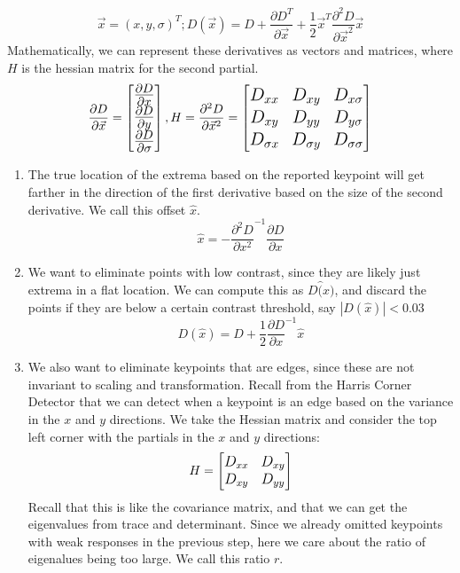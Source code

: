\documentclass{article}
\begin{document}
\begin{enumerate}
\begin{enumerate}
        $$\vec{x} = (x,y,\sigma)^T; D(\vec{x}) = D + \frac{\partial D^T}{\partial\vec{x}} + \frac{1}{2}\vec{x}^T\frac{\partial^2D}{\partial\vec{x}^2}\vec{x}$$
        Mathematically, we can represent these derivatives as vectors and matrices, where $H$ is the hessian matrix for the second partial.
        $$\frac{\partial D}{\partial \vec{x}} = \Large\begin{bmatrix}
        \frac{\partial D}{\partial x} \\
        \frac{\partial D}{\partial y} \\
        \frac{\partial D}{\partial \sigma}
        \end{bmatrix}, H = \frac{\partial^2D}{\partial\vec{x}^2} = \Large\begin{bmatrix}
        D_{xx} & D_{xy} & D_{x\sigma} \\
        D_{xy} & D_{yy} & D_{y\sigma} \\
        D_{\sigma x} & D_{\sigma y} & D_{\sigma\sigma}
        \end{bmatrix}$$ 
        \begin{enumerate}
            \item The true location of the extrema based on the reported keypoint will get farther in the direction of the first derivative based on the size of the second derivative. We call this offset $\hat{x}$.
            $$\hat{x} = - \frac{\partial^2D}{\partial x^2}^{-1}\frac{\partial D}{\partial x}$$
            \item We want to eliminate points with low contrast, since they are likely just extrema in a flat location. We can compute this as $D\hat(x)$, and discard the points if they are below a certain contrast threshold, say $|D(\hat{x})| < 0.03$
            $$D(\hat{x}) = D + \frac{1}{2}\frac{\partial D}{\partial x}^{-1}\hat{x}$$
            \item We also want to eliminate keypoints that are edges, since these are not invariant to scaling and transformation. Recall from the Harris Corner Detector that we can detect when a keypoint is an edge based on the variance in the $x$ and $y$ directions. We take the Hessian matrix and consider the top left corner with the partials in the $x$ and $y$ directions:
            $$H = \large\begin{bmatrix}
            D_{xx} & D_{xy}\\
            D_{xy} & D_{yy}
            \end{bmatrix}$$
            Recall that this is like the covariance matrix, and that we can get the eigenvalues from trace and determinant. Since we already omitted keypoints with weak responses in the previous step, here we care about the ratio of eigenalues being too large. We call this ratio $r$.

\end{enumerate}
\end{enumerate}
\end{enumerate}
\end{document}
